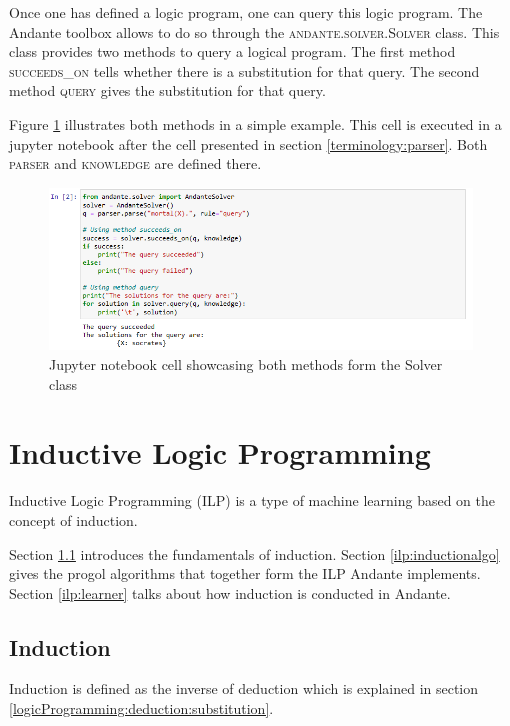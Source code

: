 \documentclass{article}
\begin{document}
Once one has defined a logic program, one can query this logic program. The 
Andante toolbox allows to do so through the \textsc{andante.solver.Solver} class.
This class provides two methods to query a logical program. The first method 
\textsc{succeeds\_on} tells whether there is a substitution for that query. The 
second method \textsc{query} gives the substitution for that query.

Figure \ref{solverexample} illustrates both methods in a simple example. This
cell is executed in a jupyter notebook after the cell presented in section 
\ref{terminology:parser}. Both \textsc{parser} and \textsc{knowledge} are
defined there.

\begin{figure}[h!]
    \includegraphics[width = \textwidth]{images/Solver example.PNG}
    \caption{Jupyter notebook cell showcasing both methods form the Solver 
    class}
    \label{solverexample}
\end{figure}

\newpage
\section{Inductive Logic Programming} \label{ilp}

Inductive Logic Programming (ILP) is a type of machine learning based on the
concept of induction.

Section \ref{ilp:induction} introduces the fundamentals of induction. 
Section \ref{ilp:inductionalgo} gives the progol algorithms that together form
the ILP Andante implements.
Section \ref{ilp:learner} talks about how induction is conducted in Andante.

\subsection{Induction} \label{ilp:induction}

Induction is defined as the inverse of deduction which is explained in section
\ref{logicProgramming:deduction:substitution}.
\end{document}
